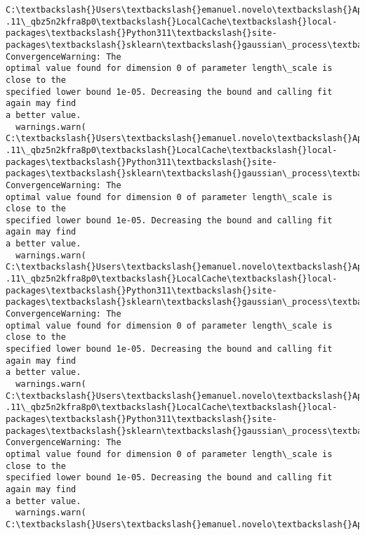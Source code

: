 \documentclass[11pt]{article}
\begin{document}
    \begin{Verbatim}[commandchars=\\\{\}]
C:\textbackslash{}Users\textbackslash{}emanuel.novelo\textbackslash{}AppData\textbackslash{}Local\textbackslash{}Packages\textbackslash{}PythonSoftwareFoundation.Python.3
.11\_qbz5n2kfra8p0\textbackslash{}LocalCache\textbackslash{}local-packages\textbackslash{}Python311\textbackslash{}site-
packages\textbackslash{}sklearn\textbackslash{}gaussian\_process\textbackslash{}kernels.py:419: ConvergenceWarning: The
optimal value found for dimension 0 of parameter length\_scale is close to the
specified lower bound 1e-05. Decreasing the bound and calling fit again may find
a better value.
  warnings.warn(
C:\textbackslash{}Users\textbackslash{}emanuel.novelo\textbackslash{}AppData\textbackslash{}Local\textbackslash{}Packages\textbackslash{}PythonSoftwareFoundation.Python.3
.11\_qbz5n2kfra8p0\textbackslash{}LocalCache\textbackslash{}local-packages\textbackslash{}Python311\textbackslash{}site-
packages\textbackslash{}sklearn\textbackslash{}gaussian\_process\textbackslash{}kernels.py:419: ConvergenceWarning: The
optimal value found for dimension 0 of parameter length\_scale is close to the
specified lower bound 1e-05. Decreasing the bound and calling fit again may find
a better value.
  warnings.warn(
C:\textbackslash{}Users\textbackslash{}emanuel.novelo\textbackslash{}AppData\textbackslash{}Local\textbackslash{}Packages\textbackslash{}PythonSoftwareFoundation.Python.3
.11\_qbz5n2kfra8p0\textbackslash{}LocalCache\textbackslash{}local-packages\textbackslash{}Python311\textbackslash{}site-
packages\textbackslash{}sklearn\textbackslash{}gaussian\_process\textbackslash{}kernels.py:419: ConvergenceWarning: The
optimal value found for dimension 0 of parameter length\_scale is close to the
specified lower bound 1e-05. Decreasing the bound and calling fit again may find
a better value.
  warnings.warn(
C:\textbackslash{}Users\textbackslash{}emanuel.novelo\textbackslash{}AppData\textbackslash{}Local\textbackslash{}Packages\textbackslash{}PythonSoftwareFoundation.Python.3
.11\_qbz5n2kfra8p0\textbackslash{}LocalCache\textbackslash{}local-packages\textbackslash{}Python311\textbackslash{}site-
packages\textbackslash{}sklearn\textbackslash{}gaussian\_process\textbackslash{}kernels.py:419: ConvergenceWarning: The
optimal value found for dimension 0 of parameter length\_scale is close to the
specified lower bound 1e-05. Decreasing the bound and calling fit again may find
a better value.
  warnings.warn(
C:\textbackslash{}Users\textbackslash{}emanuel.novelo\textbackslash{}AppData\textbackslash{}Local\textbackslash{}Packages\textbackslash{}PythonSoftwareFoundation.Python.3

\end{Verbatim}
\end{document}
